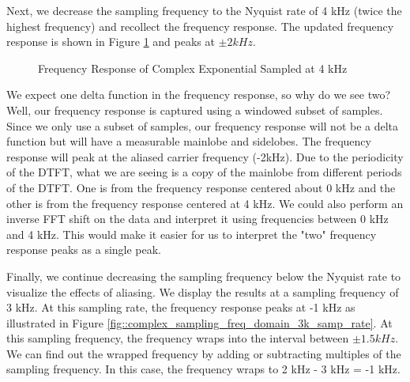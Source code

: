 \documentclass{article}
\begin{document}
Next, we decrease the sampling frequency to the Nyquist rate of 4 kHz (twice the highest frequency) and recollect the frequency response. The updated frequency response is shown in Figure \ref{fig::complex_sampling_freq_domain_4k_samp_rate} and peaks at $\pm 2 kHz$.

\begin{figure}[H]
	\centerline{}
	\caption{Frequency Response of Complex Exponential Sampled at 4 kHz}
	\label{fig::complex_sampling_freq_domain_4k_samp_rate}
\end{figure}

We expect one delta function in the frequency response, so why do we see two? Well, our frequency response is captured using a windowed subset of samples. Since we only use a subset of samples, our frequency response will not be a delta function but will have a measurable mainlobe and sidelobes. The frequency response will peak at the aliased carrier frequency (-2kHz). Due to the periodicity of the DTFT, what we are seeing is a copy of the mainlobe from different periods of the DTFT. One is from the frequency response centered about 0 kHz and the other is from the frequency response centered at 4 kHz. We could also perform an inverse FFT shift on the data and interpret it using frequencies between 0 kHz and 4 kHz. This would make it easier for us to interpret the "two" frequency response peaks as a single peak.

Finally, we continue decreasing the sampling frequency below the Nyquist rate to visualize the effects of aliasing. We display the results at a sampling frequency of 3 kHz. At this sampling rate, the frequency response peaks at -1 kHz as illustrated in Figure \ref{fig::complex_sampling_freq_domain_3k_samp_rate}. At this sampling frequency, the frequency wraps into the interval between $\pm 1.5 kHz$. We can find out the wrapped frequency by adding or subtracting multiples of the sampling frequency. In this case, the frequency wraps to 2 kHz - 3 kHz = -1 kHz.
\end{document}
